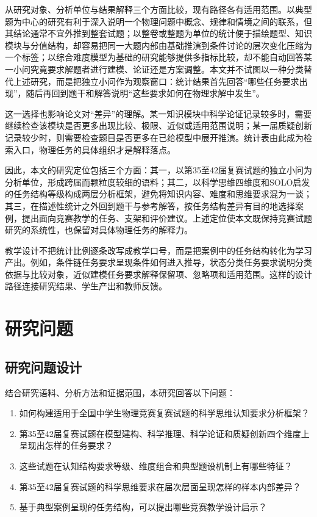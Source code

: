 \documentclass[
  12pt,
  a4paper,twoside,openany]{ctexbook}
\providecommand{\tightlist}{%
  \setlength{\itemsep}{0pt}\setlength{\parskip}{0pt}}
\begin{document}
从研究对象、分析单位与结果解释三个方面比较，现有路径各有适用范围。以典型题为中心的研究有利于深入说明一个物理问题中概念、规律和情境之间的联系，但其结论通常不宜外推到整套试题；以整卷或整题为单位的统计便于描绘题型、知识模块与分值结构，却容易把同一大题内部由基础推演到条件讨论的层次变化压缩为一个标签；以综合难度模型为基础的研究能够提供多指标比较，却不能自动回答某一小问究竟要求解题者进行建模、论证还是方案调整。本文并不试图以一种分类替代上述研究，而是把独立小问作为观察窗口：统计结果首先回答``哪些任务要求出现''，随后再回到题干和解答说明``这些要求如何在物理求解中发生''。

这一选择也影响论文对``差异''的理解。某一知识模块中科学论证记录较多时，需要继续检查该模块是否更多出现比较、极限、近似或适用范围说明；某一届质疑创新记录较少时，则需要检查题目是否更多在已给模型中展开推演。统计表由此成为检索入口，物理任务的具体组织才是解释落点。

因此，本文的研究定位包括三个方面：其一，以第35至42届复赛试题的独立小问为分析单位，形成跨届而颗粒度较细的语料；其二，以科学思维四维度和SOLO启发的任务结构等级构成两层分析框架，避免将知识内容、难度和思维要求混为一谈；其三，在描述性统计之外回到题干与参考解答，按任务结构差异有目的地选择案例，提出面向竞赛教学的任务、支架和评价建议。上述定位使本文既保持竞赛试题研究的系统性，也保留对具体物理任务的解释力。

教学设计不把统计比例逐条改写成教学口号，而是把案例中的任务结构转化为学习产出。例如，条件链任务要求呈现条件如何进入推导，状态分类任务要求说明分类依据与比较对象，近似建模任务要求解释保留项、忽略项和适用范围。这样的设计路径连接研究结果、学生产出和教师反馈。

\section{研究问题}\label{ux7814ux7a76ux95eeux9898}

\subsection{研究问题设计}\label{ux7814ux7a76ux95eeux9898ux8bbeux8ba1}

结合研究语料、分析方法和证据范围，本研究回答以下问题：

\begin{enumerate}
\def\labelenumi{\arabic{enumi}.}
\tightlist
\item
  如何构建适用于全国中学生物理竞赛复赛试题的科学思维认知要求分析框架？
\item
  第35至42届复赛试题在模型建构、科学推理、科学论证和质疑创新四个维度上呈现出怎样的任务要求？
\item
  这些试题在认知结构要求等级、维度组合和典型题设机制上有哪些特征？
\item
  第35至42届复赛试题的科学思维要求在届次层面呈现怎样的样本内部差异？
\item
  基于典型案例呈现的任务结构，可以提出哪些竞赛教学设计启示？
\end{enumerate}
\end{document}
